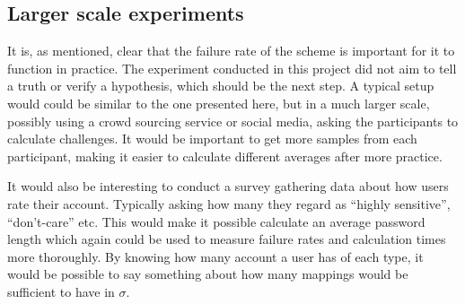 \subsection{Larger scale experiments}
It is, as mentioned, clear that the failure rate of the scheme is important for it to function in practice. The experiment conducted in this project did not aim to tell a truth or verify a hypothesis, which should be the next step. A typical setup would could be similar to the one presented here, but in a much larger scale, possibly using a crowd sourcing service or social media, asking the participants to calculate challenges. It would be important to get more samples from each participant, making it easier to calculate different averages after more practice.  
\par It would also be interesting to conduct a survey gathering data about how users rate their account. Typically asking how many they regard as ``highly sensitive'', ``don't-care'' etc. This would make it possible calculate an average password length which again could be used to measure failure rates and calculation times more thoroughly. By knowing how many account a user has of each type, it would be possible to say something about how many mappings would be sufficient to have in $\sigma$. 
